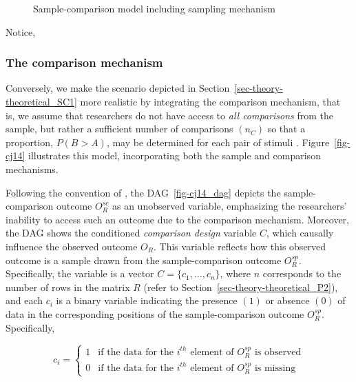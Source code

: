 \documentclass[
  authoryear,
  review,
  1p]{elsarticle}
\begin{document}
\begin{figure}[H]
\begin{minipage}{\linewidth}
{}


\end{minipage}%

\caption{\label{fig-cj12}Sample-comparison model including sampling
mechanism}

\end{figure}%

Notice,

\subsubsection{The comparison
mechanism}\label{sec-theory-theoretical_SC2}

Conversely, we make the scenario depicted in
Section~\ref{sec-theory-theoretical_SC1} more realistic by integrating
the comparison mechanism, that is, we assume that researchers do not
have access to \emph{all comparisons} from the sample, but rather a
sufficient number of comparisons \((n_{C})\) so that a proportion,
\(P(B>A)\), may be determined for each pair of stimuli
\citep[pp.~267]{Thurstone_1927b}. Figure~\ref{fig-cj14} illustrates this
model, incorporating both the sample and comparison mechanisms.

Following the convention of \citet[pp.~499-516]{McElreath_2020}, the
DAG~\ref{fig-cj14_dag} depicts the sample-comparison outcome
\(O^{sc}_{R}\) as an unobserved variable, emphasizing the researchers'
inability to access such an outcome due to the comparison mechanism.
Moreover, the DAG shows the conditioned \emph{comparison design}
variable \(C\), which causally influence the observed outcome \(O_{R}\).
This variable reflects how this observed outcome is a sample drawn from
the sample-comparison outcome \(O^{sp}_{R}\). Specifically, the variable
is a vector \(C = \{ c_{1}, \dots, c_{n} \}\), where \(n\) corresponds
to the number of rows in the matrix \(R\) (refer to
Section~\ref{sec-theory-theoretical_P2}), and each \(c_{i}\) is a binary
variable indicating the presence \((1)\) or absence \((0)\) of data in
the corresponding positions of the sample-comparison outcome
\(O^{sp}_{R}\). Specifically,

\[
c_i = \begin{cases} 
1 & \text{if the data for the } i^{th} \text{ element of } O^{sp}_{R} \text{ is observed} \\
0 & \text{if the data for the } i^{th} \text{ element of } O^{sp}_{R} \text{ is missing}
\end{cases}
\]
\end{document}
